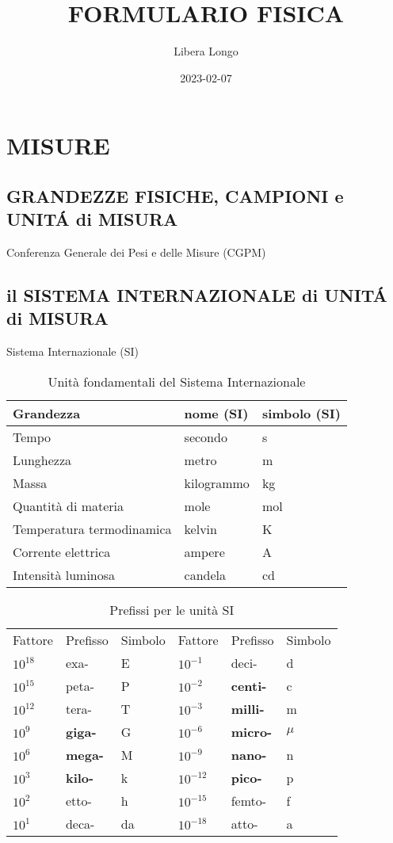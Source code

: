 \documentclass{article}
\title{FORMULARIO FISICA}
\date{2023-02-07}
\author{Libera Longo}
\begin{document}
	\maketitle
	\section{MISURE}

		\subsection{GRANDEZZE FISICHE, CAMPIONI e UNIT\'A di MISURA}
			Conferenza Generale dei Pesi e delle Misure (CGPM)

		\subsection{il SISTEMA INTERNAZIONALE di UNIT\'A di MISURA}
			Sistema Internazionale (SI)

			\begin{table}[!htb]
			\begin{tabular}{|l|l|l|}
				\hline
				Grandezza & nome (SI) & simbolo (SI) \\ \hline
				Tempo & secondo & s \\
				Lunghezza & metro & m \\
				Massa & kilogrammo & kg \\
				Quantità di materia & mole & mol \\
				Temperatura termodinamica & kelvin & K \\
				Corrente elettrica & ampere & A \\
				Intensità luminosa & candela & cd \\ \hline
			\end{tabular}
			\caption{Unità fondamentali del Sistema Internazionale}
			\end{table}

			\begin{table}[!htb]
			\begin{tabular}{|lll|lll|}
				\hline
				Fattore & Prefisso & Simbolo & Fattore & Prefisso & Simbolo \\
				$10^{18}$ & exa- & E & $10^{-1}$ & deci- & d \\
				$10^{15}$ & peta- & P & $10^{-2}$ & \textbf{centi-} & c \\
				$10^{12}$ & tera- & T & $10^{-3}$ & \textbf{milli-} & m \\
				$10^{9}$ & \textbf{giga-} & G & $10^{-6}$ & \textbf{micro-} & $\mu$ \\
				$10^{6}$ & \textbf{mega-} & M & $10^{-9}$ & \textbf{nano-} & n \\
				$10^{3}$ & \textbf{kilo-} & k & $10^{-12}$ & \textbf{pico-} & p \\
				$10^{2}$ & etto- & h & $10^{-15}$ & femto- & f \\
				$10^{1}$ & deca- & da & $10^{-18}$ & atto- & a \\ \hline
			\end{tabular}
			\caption{Prefissi per le unità SI}
			\end{table}
\end{document}
